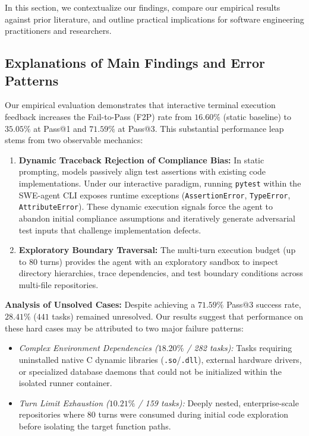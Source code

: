 \documentclass[conference]{IEEEtran}
\begin{document}
In this section, we contextualize our findings, compare our empirical results against prior literature, and outline practical implications for software engineering practitioners and researchers.

\subsection{Explanations of Main Findings and Error Patterns}
Our empirical evaluation demonstrates that interactive terminal execution feedback increases the Fail-to-Pass (F2P) rate from $16.60\%$ (static baseline) to $35.05\%$ at Pass@1 and $71.59\%$ at Pass@3. This substantial performance leap stems from two observable mechanics:

\begin{enumerate}
    \item \textbf{Dynamic Traceback Rejection of Compliance Bias:} In static prompting, models passively align test assertions with existing code implementations. Under our interactive paradigm, running \texttt{pytest} within the SWE-agent CLI exposes runtime exceptions (\texttt{AssertionError}, \texttt{TypeError}, \texttt{AttributeError}). These dynamic execution signals force the agent to abandon initial compliance assumptions and iteratively generate adversarial test inputs that challenge implementation defects.
    \item \textbf{Exploratory Boundary Traversal:} The multi-turn execution budget (up to 80 turns) provides the agent with an exploratory sandbox to inspect directory hierarchies, trace dependencies, and test boundary conditions across multi-file repositories.
\end{enumerate}

\textbf{Analysis of Unsolved Cases:} Despite achieving a $71.59\%$ Pass@3 success rate, $28.41\%$ ($441$ tasks) remained unresolved. Our results suggest that performance on these hard cases may be attributed to two major failure patterns:
\begin{itemize}
    \item \textit{Complex Environment Dependencies ($18.20\%$ / 282 tasks):} Tasks requiring uninstalled native C dynamic libraries (\texttt{.so}/\texttt{.dll}), external hardware drivers, or specialized database daemons that could not be initialized within the isolated runner container.
    \item \textit{Turn Limit Exhaustion ($10.21\%$ / 159 tasks):} Deeply nested, enterprise-scale repositories where 80 turns were consumed during initial code exploration before isolating the target function paths.
\end{itemize}
\end{document}
